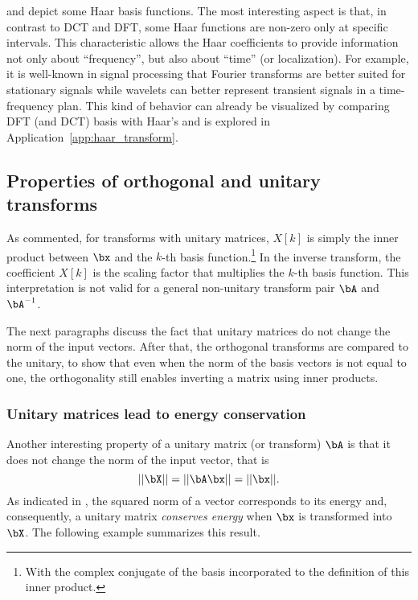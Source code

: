  and  depict some Haar basis functions. The most interesting aspect is that, in contrast to DCT and DFT, some Haar functions are non-zero only at specific intervals. This characteristic allows the Haar coefficients to provide information not only about ``frequency'', but also about ``time'' (or localization). For example, it is well-known in signal processing that Fourier transforms are better suited for stationary signals while wavelets can better represent transient signals in a time-frequency plan. This kind of behavior can already be visualized by comparing DFT (and DCT) basis with Haar's and is explored in Application~\ref{app:haar_transform}.

\subsection{{\akadvanced} Properties of orthogonal and unitary transforms}

As commented, for transforms with unitary matrices, $X[k]$ is simply the inner product between $\bx$ and the $k$-th basis function.\footnote{With the complex conjugate of the basis incorporated to the definition of this inner product.} In the inverse transform, the coefficient $X[k]$ is the scaling factor that multiplies the $k$-th basis function. This interpretation is not valid for a general non-unitary transform pair $\bA$ and $\bA^{-1}$.

The next paragraphs discuss the fact that unitary matrices do not change the norm of the input vectors.
After that, the orthogonal transforms are compared to the unitary, to show that even when the
norm of the basis vectors is not equal to one, the orthogonality still enables inverting a
matrix using inner products.

\subsubsection{{\akadvanced} Unitary matrices lead to energy conservation}


Another interesting property of a unitary matrix (or transform) $\bA$ is that it does not change the norm of the input vector, that is
\[
||\bX|| = ||\bA \bx|| = ||\bx||.
\]
As indicated in , the squared norm of a vector corresponds to its energy and, consequently, a unitary matrix \emph{conserves energy} when $\bx$ is transformed into $\bX$.
The following example summarizes this result.

